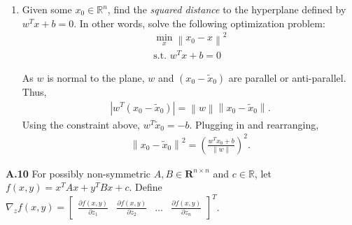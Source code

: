 \documentclass{article}
\newcommand{\norm}[1]{\left\|#1\right\|}
\newenvironment{solution}{\begin{adjustwidth}{8mm}{}}{\end{adjustwidth}}
\begin{document}
\begin{enumerate}
\begin{solution}
\begin{figure}[h]
\begin{subfigure}{0.40\linewidth}
\begin{verbatim}
                                        x1 = np.linspace(-10,10)
                                        x2 = np.linspace(-10,10)
                                        x1grid, x2grid = np.meshgrid(x1,x2)
                                        x3grid = -x1grid - x2grid

                                        fig = plt.figure(constrained_layout=True)
                                        ax = plt.axes(projection='3d')

                                        ax.contour3D(x1grid, x2grid, x3grid, 300)
                                        ax.set_xlabel("$x_1$")
                                        ax.set_ylabel("$x_2$")
                                        ax.set_zlabel("$x_3$")
                                        ax.dist=11
                                \end{verbatim}
                        \end{subfigure}  
                \end{figure}
        \end{solution} \newpage
        \item Given some $x_0 \in \mathbb{R}^n$, find the \textit{squared distance} to the hyperplane defined by $w^Tx+b=0$.
        In other words, solve the following optimization problem:
        \begin{align*}
                \min_x \norm{x_0 - x}^2 \\
                \text{s.t. } w^Tx+b = 0
        \end{align*}
        \begin{solution}
                As $w$ is normal to the plane, $w$ and $(x_0 - \tilde{x}_0)$ are parallel or anti-parallel.
                Thus, 
                \begin{align*}
                        |w^T (x_0 - \tilde{x}_0)| = \norm{w} \norm{x_0 - \tilde{x}_0}.
                \end{align*}
                Using the constraint above, $w^T \tilde{x}_0 = -b$.
                Plugging in and rearranging,
                \begin{align*}
                        \norm{x_0 - \tilde{x}_0}^2 = \left( \frac{w^T x_0 + b}{\norm{w}} \right)^2.
                \end{align*}
        \end{solution}
\end{enumerate}


\textbf{A.10}
For possibly non-symmetric $A,B \in \mathbf{R}^{n \times n}$ and $c \in \mathbb{R}$, let $f(x,y) = x^T A x + y^T B x + c$.
Define $\nabla_z f(x,y) = \begin{bmatrix}
        \frac{\partial f(x,y)}{\partial z_1} &
        \frac{\partial f(x,y)}{\partial z_2} &
        \dots &
        \frac{\partial f(x,y)}{\partial z_n}
\end{bmatrix}^T$.
\end{document}

